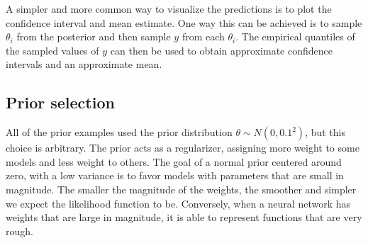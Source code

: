 \documentclass[12pt]{article}
\begin{document}
\begin{figure}[h]
\centering
{}
\caption{}
\label{fig_1d_predictions_pdf}
\end{figure}

A simpler and more common way to visualize the predictions is to plot the confidence interval and mean estimate. One way this can be achieved is to sample $\theta_i$ from the posterior and then sample $y$ from each $\theta_i$. The empirical quantiles of the sampled values of $y$ can then be used to obtain approximate confidence intervals and an approximate mean.

\begin{figure}[h]
\centering
{}
\caption{}
\label{fig_1d_predictions_ci}
\end{figure}

\subsection{Prior selection}

All of the prior examples used the prior distribution $\theta \sim N(0, 0.1^2)$, but this choice is arbitrary. The prior acts as a regularizer, assigning more weight to some models and less weight to others. The goal of a normal prior centered around zero, with a low variance is to favor models with parameters that are small in magnitude. The smaller the magnitude of the weights, the smoother and simpler we expect the likelihood function to be. Conversely, when a neural network has weights that are large in magnitude, it is able to represent functions that are very rough.
\end{document}
